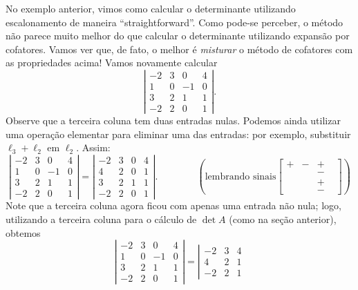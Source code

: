 \documentclass[../livro.tex]{subfiles}  %
\begin{document}
\begin{remark}
No exemplo anterior, vimos como calcular o determinante utilizando escalonamento de maneira ``straightforward''. Como pode-se perceber, o método não parece muito melhor do que calcular o determinante utilizando expansão por cofatores. Vamos ver que, de fato, o melhor é \textit{misturar} o método de cofatores com as propriedades acima! Vamos novamente calcular
\[
\left| \begin{matrix}
-2 & 3 & 0  & 4 \\
1  & 0 & -1 & 0 \\
3  & 2 & 1  & 1 \\
-2 & 2 & 0  & 1
\end{matrix}
\right|.
\] Observe que a terceira coluna tem duas entradas nulas. Podemos ainda utilizar uma operação elementar para eliminar uma das entradas: por exemplo, substituir $\ell_3 + \ell_2$ em $\ell_2$. Assim:
\[
\left| \begin{matrix}
-2 & 3 & 0  & 4 \\
1  & 0 & -1 & 0 \\
3  & 2 & 1  & 1 \\
-2 & 2 & 0  & 1
\end{matrix}
\right| = 
\left| \begin{matrix}
-2 & 3 & 0  & 4 \\
4  & 2 & 0  & 1 \\
3  & 2 & 1  & 1 \\
-2 & 2 & 0  & 1
\end{matrix}
\right|. \qquad  \qquad \left(  \text{lembrando sinais}
\begin{bmatrix}
+ & - & + &  \\
  &   & - &  \\
  &   & + &  \\
  &   & - & 
\end{bmatrix}
\right) 
\] Note que a terceira coluna agora ficou com apenas uma entrada não nula; logo, utilizando a terceira coluna para o cálculo de $\det A$ (como na seção anterior), obtemos
\[
\left| \begin{matrix}
-2 & 3 & 0  & 4 \\
1  & 0 & -1 & 0 \\
3  & 2 & 1  & 1 \\
-2 & 2 & 0  & 1
\end{matrix}
\right| = 
\left| \begin{matrix}
-2 & 3 & 4 \\
4  & 2 & 1 \\
-2 & 2 & 1
\end{matrix}
\]
\end{remark}
\end{document}

